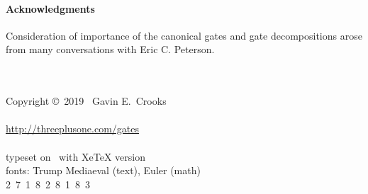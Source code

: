 \documentclass[article,pagebackref]{bespoke5}
\begin{document}
\paragraph{Acknowledgments}
Consideration of importance of the canonical gates and gate decompositions arose from many conversations with Eric C. Peterson.







\vfill
{\center
~\\~\\
Copyright \copyright~2019~ Gavin E.\ Crooks~\\
~ %
\\
\url{http://threeplusone.com/gates} 
\\
~
\\
typeset on \isotoday~with XeTeX version \the\XeTeXversion\XeTeXrevision
\\
fonts: Trump Mediaeval (text), Euler (math)
\\
2~7~1~8~2~8~1~8~3
\\
~ 
\\
}
\end{document}
